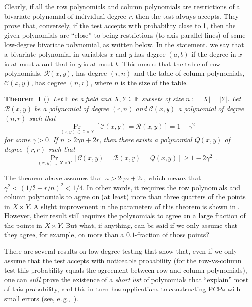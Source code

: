 \documentclass[11pt]{article}
\numberwithin{equation}{section}
\newtheorem{theorem}{Theorem}[section]
\theoremstyle{definition}
\theoremstyle{plain}
\newcommand{\eg}{e.\,g.}
\theoremstyle{plain}
\newcommand{\colored}{}
\newcommand{\blocklength}{\colored{n}} %
\newcommand{\Field}{\colored{\mathbb F}}
\newcommand{\degree}{\colored{r}}
\newcommand{\rowpoly}{\colored{\mathcal R}}
\newcommand{\colpoly}{\colored{\mathcal C}}
\newcommand{\PSprox}{\colored{\gamma}}
\newcommand{\DefineEqual}{:=}
\newcommand\abs[1]{\colored{\left|#1\right|}}
\begin{document}
Clearly, if all the row polynomials and column polynomials are restrictions of a bivariate polynomial of individual degree $\degree$, then the test always accepts. They prove that, conversely, if the test accepts with probability close to 1, then the given polynomials are ``close'' to being restrictions (to axis-parallel lines) of some low-degree bivariate polynomial, as written below. In the statement, we say that a bivariate polynomial in variables $x$ and $y$ has degree $(a,b)$ if the degree in $x$ is at most $a$ and that in $y$ is at most $b$. This means that the table of row polynomials, $\rowpoly(x,y)$, has degree $(\degree, \blocklength)$ and the table of column polynomials, $\colpoly(x,y)$, has degree $(\blocklength, \degree)$, where $\blocklength$ is the size of the table.

\begin{theorem}[\cite{PolishchukS94}]
\label{thm:PS94}
Let $\Field$ be a field and $X,Y \subseteq \Field$ subsets of size $\blocklength \DefineEqual \abs{X} = \abs{Y}$.
Let $\rowpoly(x,y)$ be a polynomial of degree $(\degree,\blocklength)$ and $\colpoly(x,y)$ a polynomial of degree $(\blocklength,\degree)$ such that
\begin{equation*}
\Pr_{(x,y) \in X \times Y}
[\colpoly(x,y) = \rowpoly(x,y)]
= 1 - \PSprox^2
\end{equation*}
for some $\PSprox>0$.
If $\blocklength > 2 \PSprox \blocklength + 2\degree$, then there exists a polynomial $Q(x,y)$ of degree $(\degree,\degree)$ such that
\begin{equation*}
\Pr_{(x,y) \in X \times Y}[\colpoly(x,y) = \rowpoly(x,y) = Q(x,y)] \geq 1 - 2\PSprox^2 \enspace.
\end{equation*}
\end{theorem}

The theorem above assumes that $\blocklength > 2 \PSprox \blocklength + 2\degree$, which means that $\PSprox^2 < (1/2-\degree/\blocklength)^{2} < 1/4$. In other words, it requires the row polynomials and column polynomials to agree on (at least) more than three quarters of the points in $X \times Y$.
A slight improvement in the parameters of this theorem is shown in \cite{BenSassonCGT13}. However, their result still requires the polynomials to agree on a large fraction of the points in $X \times Y$.
But what, if anything, can be said if we only assume that they agree, for example, on more than a $0.1$-fraction of those points?

There are several results on low-degree testing that show that, even if we only assume that the test accepts with noticeable probability (for the row-vs-column test this probability equals the agreement between row and column polynomials), one can \emph{still} prove the existence of a \emph{short list} of polynomials that ``explain'' most of this probability, and this in turn has applications to constructing PCPs with small errors (see, \eg,~\cite{RazS97,AroraS03,MoshkovitzR08-ldt}).
\end{document}

